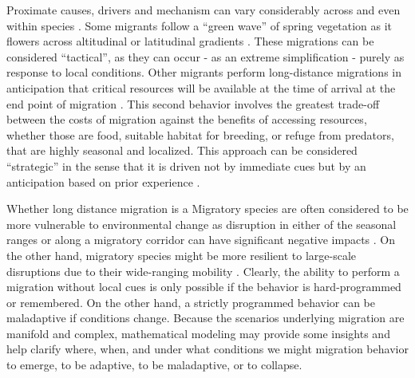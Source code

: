 \documentclass[utf8]{frontiersSCNS} %
\begin{document}
Proximate causes, drivers and mechanism can vary considerably across and even within species \citep{Berthold1999, Shaw2016}. Some migrants follow a ``green wave'' of spring vegetation as it flowers across altitudinal or latitudinal gradients \citep{Bischof2012, Kolzsch2015, Merkle2016}. These migrations can be considered ``tactical'', as they can occur - as an extreme simplification - purely as response to local conditions. Other migrants perform long-distance migrations in anticipation that critical resources will be available at the time of arrival at the end point of migration \citep{Abrahms2019}. This second behavior involves the greatest trade-off between the costs of migration against the benefits of accessing resources, whether those are food, suitable habitat for breeding, or refuge from predators, that are highly seasonal and localized. This approach can be considered ``strategic'' in the sense that it is driven not by immediate cues but by an anticipation based on prior experience \citep{Bracis2017}. 

Whether long distance migration is a Migratory species are often considered to be more vulnerable to environmental change as disruption in either of the seasonal ranges or along a migratory corridor can have significant negative impacts \citep{Wilcove2008, Kauffman2021}. On the other hand, migratory species might be more resilient to large-scale disruptions due to their wide-ranging mobility \citep{Robinson2009}. Clearly, the ability to perform a migration without local cues is only possible if the behavior is hard-programmed or remembered. On the other hand, a strictly programmed behavior can be maladaptive if conditions change. Because the scenarios underlying migration are manifold and complex, mathematical modeling may provide some insights and help clarify where, when, and under what conditions we might migration behavior to emerge, to be adaptive, to be maladaptive, or to collapse.
\end{document}
